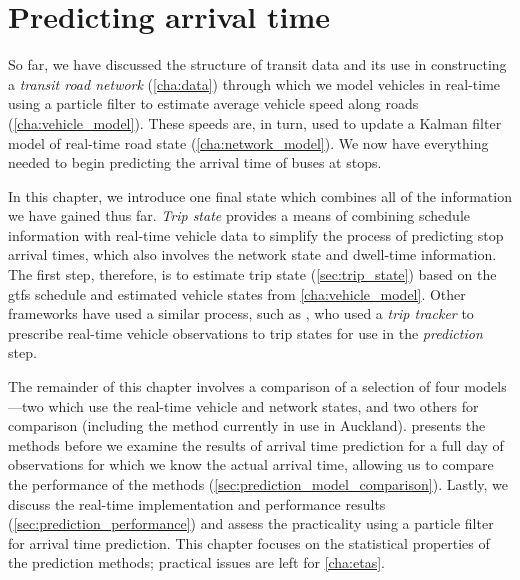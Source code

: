 \chapter{Predicting arrival time}
\label{cha:prediction}

So far, we have discussed the structure of transit data and its use in constructing a \emph{transit road network} (\cref{cha:data}) through which we model vehicles in real-time using a particle filter to estimate average vehicle speed along roads (\cref{cha:vehicle_model}). These speeds are, in turn, used to update a Kalman filter model of real-time road state (\cref{cha:network_model}). We now have everything needed to begin predicting the arrival time of buses at stops.

In this chapter, we introduce one final state which combines all of the information we have gained thus far. \emph{Trip state} provides a means of combining schedule information with real-time vehicle data to simplify the process of predicting stop arrival times, which also involves the network state and dwell-time information. The first step, therefore, is to estimate trip state (\cref{sec:trip_state}) based on the \gls{gtfs} schedule and estimated vehicle states from \cref{cha:vehicle_model}. Other frameworks have used a similar process, such as \citet{Cathey_2003}, who used a \emph{trip tracker} to prescribe real-time vehicle observations to trip states for use in the \emph{prediction} step.

The remainder of this chapter involves a comparison of a selection of four models---two which use the real-time vehicle and network states, and two others for comparison (including the method currently in use in Auckland).  presents the methods before we examine the results of arrival time prediction for a full day of observations for which we know the actual arrival time, allowing us to compare the performance of the methods (\cref{sec:prediction_model_comparison}). Lastly, we discuss the real-time implementation and performance results (\cref{sec:prediction_performance}) and assess the practicality using a particle filter for arrival time prediction. This chapter focuses on the statistical properties of the prediction methods; practical issues are left for \cref{cha:etas}.






